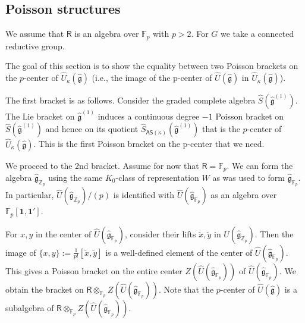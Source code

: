 \documentclass{amsart}
\theoremstyle{definition}
\newcommand{\Ring}{\mathsf{R}}
\newcommand{\g}{\mathfrak{g}}
\newcommand{\F}{\mathbb{F}}
\newcommand{\Z}{\mathbb{Z}}
\newcommand{\AS}{\mathsf{AS}}
\numberwithin{equation}{section}
\begin{document}
\subsection{Poisson structures}\label{SS_pcenter_Poisson}
We assume that $\Ring$ is an algebra over $\F_p$ with $p>2$. For $G$ we take a connected reductive group. 

The goal of this section is to show the equality between two Poisson brackets on the $p$-center of $\widehat{U}_\kappa(\hat{\g})$
(i.e., the image of the p-center of $\widehat{U}(\hat{\g})$ in $\widehat{U}_\kappa(\hat{\g})$). 

The first bracket is as follows. Consider the graded complete algebra $\widehat{S}(\hat{\g}^{(1)})$. The Lie bracket on $\hat{\g}^{(1)}$ induces a continuous degree $-1$ Poisson bracket on  $\widehat{S}(\hat{\g}^{(1)})$ and hence on its quotient $\widehat{S}_{\AS(\kappa)}(\hat{\g}^{(1)})$  that is the $p$-center of 
$\widehat{U}_\kappa(\hat{\g})$. This is the first Poisson bracket on the p-center that we need.


We proceed to the 2nd bracket. 
Assume for now that $\Ring=\F_p$.   We can form the algebra $\hat{\g}_{\Z_p}$ using the same $K_0$-class of representation $W$ as was used to form 
$\hat{\g}_{\F_p}$. In particular, $\widehat{U}(\hat{\g}_{\Z_p})/(p)$ is identified with $\widehat{U}(\hat{\g}_{\F_p})$ as an algebra over $\F_p[\mathbf{1},\mathbf{1}']$.

For $x,y$ in the center of $\widehat{U}(\hat{\g}_{\F_p})$, consider their lifts $\breve{x},\breve{y}$ in $U(\hat{\g}_{\Z_p})$. Then the image of $\{x,y\}:=\frac{1}{p!}[\tilde{x},\tilde{y}]$ is a well-defined element of the center of  $\widehat{U}(\hat{\g}_{\F_p})$. This gives a Poisson bracket on the entire center 
$Z(\widehat{U}(\hat{\g}_{\F_p}))$ of 
$\widehat{U}(\hat{\g}_{\F_p})$. We obtain 
the bracket on $\Ring\otimes_{\F_p}Z(\widehat{U}(\hat{\g}_{\F_p}))$. Note that the $p$-center of $\widehat{U}(\hat{\g})$ is a subalgebra of $\Ring\otimes_{\F_p}Z(\widehat{U}(\hat{\g}_{\F_p}))$. 
\end{document}
